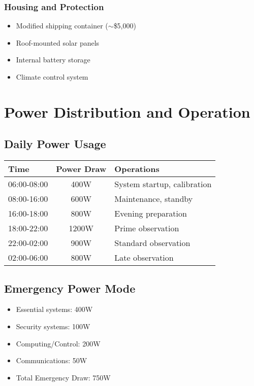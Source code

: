 \documentclass{article}
\begin{document}
\subsubsection{Housing and Protection}
\begin{itemize}
    \item Modified shipping container ($\sim$\$5,000)
    \item Roof-mounted solar panels
    \item Internal battery storage
    \item Climate control system
\end{itemize}

\section{Power Distribution and Operation}

\subsection{Daily Power Usage}
\begin{table}[h]
\begin{tabularx}{\textwidth}{|X|c|X|}
\hline
\textbf{Time} & \textbf{Power Draw} & \textbf{Operations} \\
\hline
06:00-08:00 & 400W & System startup, calibration \\
08:00-16:00 & 600W & Maintenance, standby \\
16:00-18:00 & 800W & Evening preparation \\
18:00-22:00 & 1200W & Prime observation \\
22:00-02:00 & 900W & Standard observation \\
02:00-06:00 & 800W & Late observation \\
\hline
\end{tabularx}
\end{table}

\subsection{Emergency Power Mode}
\begin{itemize}
    \item Essential systems: 400W
    \item Security systems: 100W
    \item Computing/Control: 200W
    \item Communications: 50W
    \item Total Emergency Draw: 750W
\end{itemize}
\end{document}
